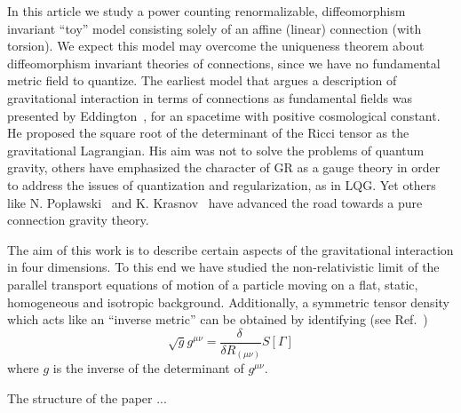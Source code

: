 \documentclass[twocolumn,aps,
  showpacs,showkeys,prd,superscriptaddress]{revtex4-1}
\newcommand{\hl}[1]{{\color{red} \textbf{#1}}}
\begin{document}
In this article we study a power counting renormalizable,  diffeomorphism invariant ``toy'' model  consisting  solely of an affine (linear) connection  (with torsion).
We expect  this model may  overcome  the uniqueness theorem about diffeomorphism invariant theories of connections, since we  have no fundamental metric field to quantize. The earliest model that argues  a description of gravitational interaction in terms of connections as fundamental fields  was presented by Eddington~\cite{Eddington1923math}, for an spacetime with positive cosmological constant. He proposed the square root of the determinant of the Ricci tensor as the gravitational Lagrangian. His aim was not to solve the problems of quantum gravity,  others have emphasized the character of GR as a gauge theory in order to address the issues of quantization and regularization, as in LQG. Yet others like N. Poplawski~\cite{Poplawski:2012bw} and K. Krasnov~\cite{Krasnov:2011pp} have advanced the road towards a pure connection gravity theory.

The aim of this work is to describe certain aspects of the gravitational interaction in four dimensions. To this end we have studied the non-relativistic limit of the parallel transport equations of motion of a particle moving on a flat, static, homogeneous and isotropic background. Additionally, a  symmetric tensor density which acts like an ``inverse metric'' can be obtained by identifying (see Ref.~\cite{Poplawski:2012bw})
\begin{equation}\label{metric}
  \sqrt{g}g^{\mu\nu} = \frac{\delta\ }{\delta R_{(\mu\nu)}} S[\Gamma]
\end{equation}
where $g$ is the inverse of the determinant of $g^{\mu\nu}$.

The structure of the paper ...

\end{document}
